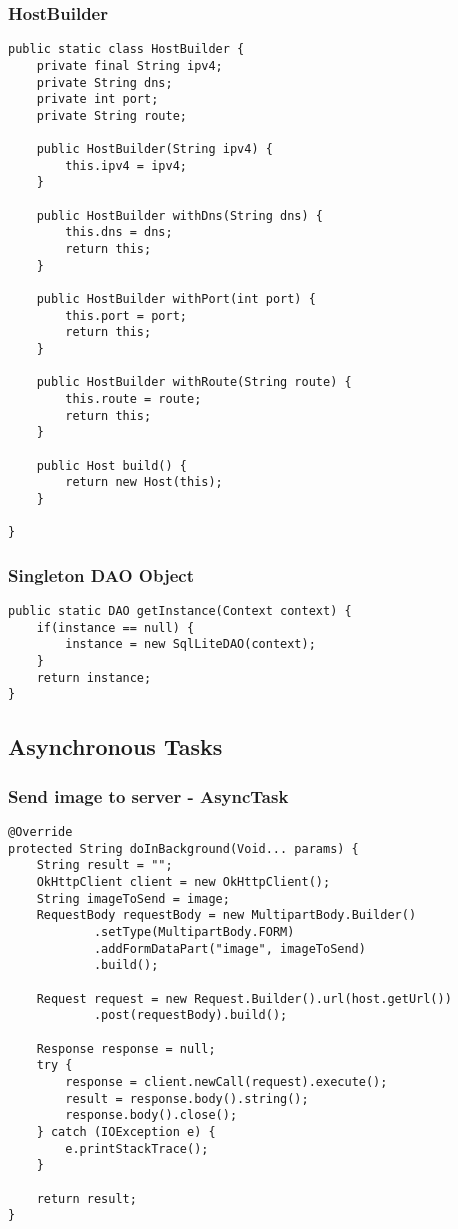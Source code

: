 \subsubsection*{HostBuilder}
\begin{lstlisting}[style=Java]
public static class HostBuilder {
    private final String ipv4;
    private String dns;
    private int port;
    private String route;

    public HostBuilder(String ipv4) {
        this.ipv4 = ipv4;
    }

    public HostBuilder withDns(String dns) {
        this.dns = dns;
        return this;
    }

    public HostBuilder withPort(int port) {
        this.port = port;
        return this;
    }

    public HostBuilder withRoute(String route) {
        this.route = route;
        return this;
    }

    public Host build() {
        return new Host(this);
    }

}
\end{lstlisting}

\subsubsection*{Singleton DAO Object}
\begin{lstlisting}[style=Java]
public static DAO getInstance(Context context) {
    if(instance == null) {
        instance = new SqlLiteDAO(context);
    }
    return instance;
}
\end{lstlisting}

\subsection*{Asynchronous Tasks}
\subsubsection*{Send image to server - AsyncTask}
\begin{lstlisting}[style=Java]
@Override
protected String doInBackground(Void... params) {
    String result = "";
    OkHttpClient client = new OkHttpClient();
    String imageToSend = image;
    RequestBody requestBody = new MultipartBody.Builder()
            .setType(MultipartBody.FORM)
            .addFormDataPart("image", imageToSend)
            .build();

    Request request = new Request.Builder().url(host.getUrl())
            .post(requestBody).build();

    Response response = null;
    try {
        response = client.newCall(request).execute();
        result = response.body().string();
        response.body().close();
    } catch (IOException e) {
        e.printStackTrace();
    }

    return result;
}
\end{lstlisting}

